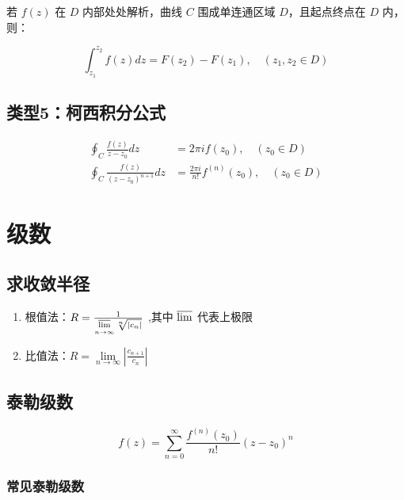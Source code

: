 \documentclass{article}
\begin{document}
若 $f(z)$ 在 $D$ 内部处处解析，曲线 $C$ 围成单连通区域 $D$，且起点终点在 $D$ 内，则：

\begin{equation}
    \int_{z_1}^{z_2} f(z) dz = F(z_2) - F(z_1), \quad (z_1,z_2 \in D)
\end{equation}

\subsection{类型5：柯西积分公式}

\begin{equation}
    \begin{aligned}
        \oint_C \frac{f(z)}{z-z_0} dz &= 2\pi i f(z_0), \quad (z_0 \in D) \\
        \oint_C \frac{f(z)}{(z-z_0)^{n+1}} dz &= \frac{2\pi i}{n!} f^{(n)}(z_0), \quad (z_0 \in D)
    \end{aligned}
\end{equation}

\section{级数}

\subsection{求收敛半径}

\begin{enumerate}
    \item 根值法：$R = \frac{1}{\varlimsup\limits_{n \to \infty} \sqrt[n]{\left\lvert c_n \right\rvert}}$ ,其中 $\varlimsup$ 代表上极限
    \item 比值法：$R = \lim\limits_{n \to \infty} \left\lvert \frac{c_{n+1}}{c_n} \right\rvert$
\end{enumerate}

\subsection{泰勒级数}

\begin{equation}
    f(z) = \sum_{n=0}^{\infty} \frac{f^{(n)}(z_0)}{n!} (z-z_0)^n
\end{equation}

\subsubsection{常见泰勒级数}
\end{document}
